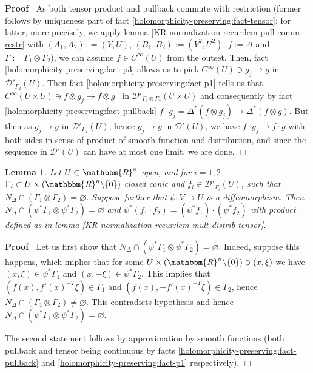 \documentclass{article}
\newcommand{\assign}{:=}
\renewenvironment{proof}{\noindent\textbf{Proof\ }}{\hspace*{\fill}$\Box$\medskip}
\newtheorem{lemma}[proposition]{Lemma}
\theoremstyle{remark}
\begin{document}
\begin{proof}
  As both tensor product and pullback commute with restriction (former follows
  by uniqueness part of fact \ref{holomorphicity-preserving:fact-tensor}; for
  latter, more precisely, we apply lemma
  \ref{KR-normalization-recur:lem-pull-comm-restr} with $(A_1, A_2) : = (V,
  U)$, $(B_1, B_2) \assign (V^2, U^2)$, $f \assign \Delta$ and $\Gamma \assign
  \Gamma_1 \otimes \Gamma_2$), we can assume $f \in C^{\infty} (U)$ from the
  outset. Then, fact \ref{holomorphicity-preserving:fact-p3} allows us to pick
  $C^{\infty} (U) \ni g_j \rightarrow g$ in $\mathcal{D}'_{\Gamma_2} (U)$.
  Then fact \ref{holomorphicity-preserving:fact-p1} tells us that $C^{\infty}
  (U \times U) \ni f \otimes g_j \rightarrow f \otimes g$ \ in
  $\mathcal{D}'_{\Gamma_1 \otimes \Gamma_2} (U \times U)$ and consequently by
  fact \ref{holomorphicity-preserving:fact-pullback} $f \cdot g_j =
  \Delta^{\ast} (f \otimes g_j) \rightarrow \Delta^{\ast} (f \otimes g)$. But
  then as $g_j \rightarrow g$ in $\mathcal{D}'_{\Gamma_2} (U)$, hence $g_j
  \rightarrow g$ in $\mathcal{D}' (U)$, we have $f \cdot g_j \rightarrow f
  \cdot g$ with both sides in sense of product of smooth function and
  distribution, and since the sequence in $\mathcal{D}' (U)$ can have at most
  one limit, we are done.
\end{proof}

\begin{lemma}
  \label{KR-normalization-recur:lem-mult-comm-pull}Let $U \subset
  \mathbbm{R}^n$ open, and for $i = 1, 2$ $\Gamma_i \subset U \times
  (\mathbbm{R}^n \backslash \{ 0 \})$ closed conic and $f_i \in
  \mathcal{D}'_{\Gamma_i} (U)$, such that $N_{\Delta} \cap (\Gamma_1 \otimes
  \Gamma_2) = \varnothing$. Suppose further that $\psi : V \rightarrow U$ is a
  diffeomorphism. Then $N_{\Delta} \cap (\psi^{\ast} \Gamma_1 \otimes
  \psi^{\ast} \Gamma_2) = \varnothing$ and $\psi^{\ast} (f_1 \cdot f_2) =
  (\psi^{\ast} f_1) \cdot (\psi^{\ast} f_2)$ with product defined as in lemma
  \ref{KR-normalization-recur:lem-mult-distrib-tensor}.
\end{lemma}

\begin{proof}
  Let us first show that $N_{\Delta} \cap (\psi^{\ast} \Gamma_1 \otimes
  \psi^{\ast} \Gamma_2) = \varnothing$. Indeed, suppose this happens, which
  implies that for some $U \times (\mathbbm{R}^n \backslash \{ 0 \}) \ni (x,
  \xi)$ we have $(x, \xi) \in \psi^{\ast} \Gamma_1$ and $(x, - \xi) \in
  \psi^{\ast} \Gamma_2$. This implies that $(f (x), f' (x)^{- T} \xi) \in
  \Gamma_1$ and $(f (x), - f' (x)^{- T} \xi) \in \Gamma_2$, hence $N_{\Delta}
  \cap (\Gamma_1 \otimes \Gamma_2) \neq \varnothing$. This contradicts
  hypothesis and hence $N_{\Delta} \cap (\psi^{\ast} \Gamma_1 \otimes
  \psi^{\ast} \Gamma_2) = \varnothing$.
  
  The second statement follows by approximation by smooth functions (both
  pullback and tensor being continuous by facts
  \ref{holomorphicity-preserving:fact-pullback} and
  \ref{holomorphicity-preserving:fact-p1} respectively).
\end{proof}
\end{document}
